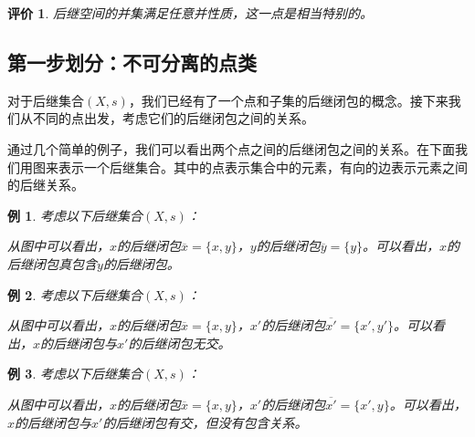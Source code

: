 \documentclass[oneside, 12pt]{ctexart}
\newtheorem{remark}{评价}[section]
\newtheorem{example}{例}[section]
\begin{document}
\begin{remark}
	后继空间的并集满足任意并性质，这一点是相当特别的。
\end{remark}


\subsection{第一步划分：不可分离的点类}

对于后继集合$(X, s)$，我们已经有了一个点和子集的后继闭包的概念。接下来我们从不同的点出发，考虑它们的后继闭包之间的关系。

通过几个简单的例子，我们可以看出两个点之间的后继闭包之间的关系。在下面我们用图来表示一个后继集合。其中的点表示集合中的元素，有向的边表示元素之间的后继关系。

\begin{example}
	考虑以下后继集合$(X, s)$：
	\begin{figure}[H]
		\centering
	\end{figure}
	从图中可以看出，$x$的后继闭包$\overline{x} = \{x, y\}$，$y$的后继闭包$\overline{y} = \{y\}$。可以看出，$x$的后继闭包真包含$y$的后继闭包。
\end{example}

\begin{example}
	考虑以下后继集合$(X, s)$：
	\begin{figure}[H]
		\centering
	\end{figure}
	从图中可以看出，$x$的后继闭包$\overline{x} = \{x, y\}$，$x'$的后继闭包$\overline{x'} = \{x', y'\}$。可以看出，$x$的后继闭包与$x'$的后继闭包无交。
\end{example}

\begin{example}
	考虑以下后继集合$(X, s)$：
	\begin{figure}[H]
		\centering
	\end{figure}
	从图中可以看出，$x$的后继闭包$\overline{x} = \{x, y\}$，$x'$的后继闭包$\overline{x'} = \{x', y\}$。可以看出，$x$的后继闭包与$x'$的后继闭包有交，但没有包含关系。
\end{example}
\end{document}
